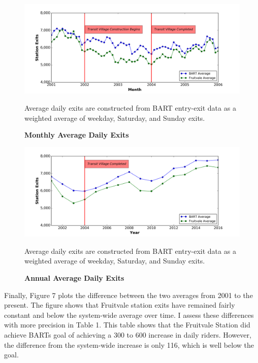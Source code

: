 \documentclass{article}
\begin{document}
\begin{figure}[H]
	\label{fig:Figure 5}
	\caption{\textbf{Monthly Average Daily Exits}}
	\begin{minipage}{\textwidth} %
	\includegraphics[width=\linewidth]{fig5.png}
	{\footnotesize Average daily exits are constructed from BART entry-exit data as a weighted average of weekday, Saturday, and Sunday exits.  \par}
	\end{minipage}
\end{figure}


\begin{figure}[H]
	\label{fig:Figure 6}
	\caption{\textbf{Annual Average Daily Exits}}
	\begin{minipage}{\textwidth} %
	\includegraphics[width=\linewidth]{fig6.png}
	{\footnotesize Average daily exits are constructed from BART entry-exit data as a weighted average of weekday, Saturday, and Sunday exits.  \par}
	\end{minipage}
\end{figure}

\noindent
Finally, Figure 7 plots the difference between the two averages from 2001 to the present. The figure shows that Fruitvale station exits have remained fairly constant and below the system-wide average over time. I assess these differences with more precision in Table 1. This table shows that the Fruitvale Station did achieve BART\textquotesingle s goal of achieving a 300 to 600 increase in daily riders. However, the difference from the system-wide increase is only 116, which is well below the goal. \\
\end{document}
